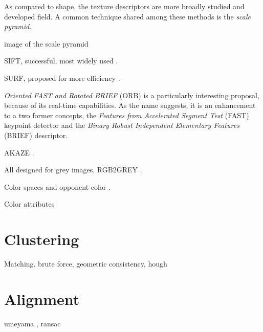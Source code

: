 As compared to shape, the texture descriptors are more broadly studied and developed field. A common technique shared among these methods is the \textit{scale pyramid}.

image of the scale pyramid

SIFT, successful, most widely used \cite{SIFT}.

SURF, proposed for more efficiency \cite{SURF}.

\textit{Oriented FAST and Rotated BRIEF} (ORB) \cite{ORB} is a particularly interesting proposal, because of its real-time capabilities. As the name suggests, it is an enhancement to a two former concepts, the\textit{ Features from Accelerated Segment Test} (FAST) \cite{FAST} keypoint detector and the \textit{Binary Robust Independent
Elementary Features} (BRIEF) \cite{BRIEF} descriptor.

AKAZE \cite{AKAZE}.

All designed for grey images, RGB2GREY \cite{RGB2GREY}.

Color spaces and opponent color \cite{ColorComparison}.

Color attributes \cite{ColorAttributes}


\section{Clustering}
\label{sec:clustering}

Matching.
brute force, geometric consistency, hough


\section{Alignment}
\label{sec:alignment}



umeyama \cite{umeyama}, ransac

